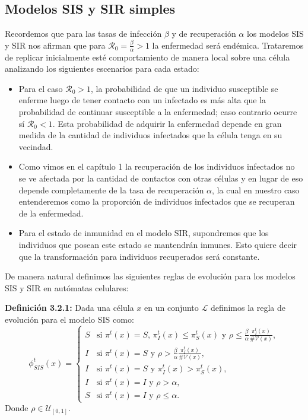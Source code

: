 \subsection{Modelos SIS y SIR simples}

Recordemos que para las tasas de infección $\beta$ y de recuperación $\alpha$ los modelos SIS y SIR nos afirman que para $\mathcal{R}_0=\frac{\beta}{\alpha}>1$ la enfermedad será endémica. Trataremos de replicar inicialmente esté comportamiento de manera local sobre una célula analizando los siguientes escenarios para cada estado:

\begin{itemize}
    \item Para el caso $\mathcal{R}_0>1$, la probabilidad de que un individuo susceptible se enferme luego de tener contacto con un infectado es más alta que la probabilidad de continuar susceptible a la enfermedad; caso contrario ocurre sí $\mathcal{R}_0<1$. Esta probabilidad de adquirir la enfermedad depende en gran medida de la cantidad de individuos infectados que la célula tenga en su vecindad. 
    
    \item Como vimos en el capítulo 1 la recuperación de los individuos infectados no se ve afectada por la cantidad de contactos con otras células y en lugar de eso depende completamente de la tasa de recuperación $\alpha$, la cual en nuestro caso entenderemos como la proporción de individuos infectados que se recuperan de la enfermedad.
    
    \item Para el estado de inmunidad en el modelo SIR, supondremos que los individuos que posean este estado se mantendrán inmunes. Esto quiere decir que la transformación para individuos recuperados será constante.
\end{itemize}

De manera natural definimos las siguientes reglas de evolución para los modelos SIS y SIR en autómatas celulares:

\textbf{Definición 3.2.1:} Dada una célula $x$ en un conjunto $\mathcal{L}$ definimos la regla de evolución para el modelo SIS como:
\begin{equation}
    \phi_{SIS}^t(x)=\left\{\begin{array}{ll}
        S & \text{si }\pi^t(x)=S\text{, }\pi_I^t(x)\leq\pi_S^t(x)\text{ y }\rho\leq\frac{\beta}{\alpha}\frac{\pi_I^t(x)}{\#\mathcal{V}(x)}, \\
        I & \text{si }\pi^t(x)=S\text{ y }\rho>\frac{\beta}{\alpha}\frac{\pi_I^t(x)}{\#\mathcal{V}(x)}, \\
        I & \text{si }\pi^t(x)=S\text{ y }\pi_I^t(x)>\pi_S^t(x), \\
        I & \text{si }\pi^t(x)=I\text{ y }\rho>\alpha,\\
        S & \text{si }\pi^t(x)=I\text{ y }\rho\leq\alpha.
    \end{array}\right.
\end{equation}
Donde $\rho\in\mathcal{U}_{[0,1]}$.
    
